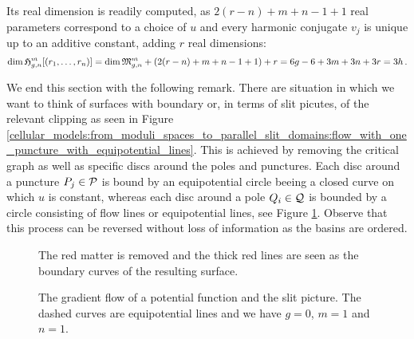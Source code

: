 Its real dimension is readily computed, as $2(r-n) + m+n-1 + 1$ real parameters correspond to a choice of $u$ and
every harmonic conjugate $v_j$ is unique up to an additive constant, adding $r$ real dimensions:
\[
    \dim \Harmr = \dim \Modspc + (2(r-n) + m+n-1 + 1) + r = 6g-6 + 3m + 3n + 3r = 3h \,.
\]

We end this section with the following remark.
There are situation in which we want to think of surfaces with boundary or, in terms of slit picutes, of the relevant clipping as seen in Figure \ref{cellular_models:from_moduli_spaces_to_parallel_slit_domains:flow_with_one_puncture_with_equipotential_lines}.
This is achieved by removing the critical graph as well as specific discs around the poles and punctures.
Each disc around a puncture $P_j \in \mathcal{P}$ is bound by an equipotential circle beeing a closed curve on which $u$ is constant,
whereas each disc around a pole $Q_i \in \mathcal{Q}$ is bounded by a circle consisting of flow lines or equipotential lines, see Figure \ref{cellular_models:from_moduli_spaces_to_parallel_slit_domains:flow_with_three_basins_and_cut}.
Observe that this process can be reversed without loss of information as the basins are ordered.
\begin{figure}[ht]
    \centering
    \def\svgwidth{.4\columnwidth}
    
    \caption{\label{cellular_models:from_moduli_spaces_to_parallel_slit_domains:flow_with_three_basins_and_cut}%
        The red matter is removed and the thick red lines are seen as the boundary curves of the resulting surface.}
\end{figure}

\begin{sidewaysfigure}[hbtp]
    \centering
    \def\svgwidth{\columnwidth}
    
    
    \vspace{.5cm}
    
    \def\svgwidth{.4\columnwidth}
    
    \caption{
        \label{page:huge_picture_flow}
        \label{cellular_models:from_moduli_spaces_to_parallel_slit_domains:flow_with_one_puncture_with_equipotential_lines_with_help}%
        The gradient flow of a potential function and the slit picture.
        The dashed curves are equipotential lines and we have $g=0$, $m=1$ and $n=1$.}
\end{sidewaysfigure}

